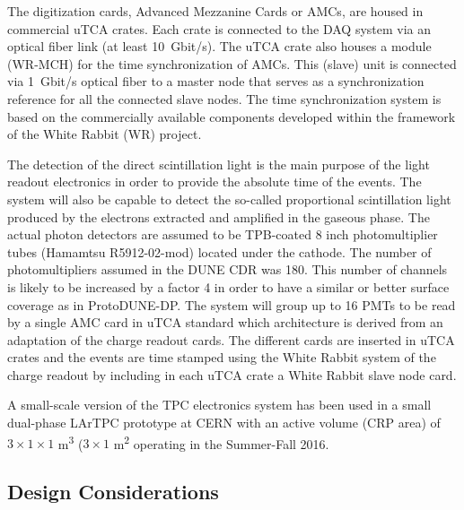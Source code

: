 The digitization cards, Advanced Mezzanine Cards or AMCs, are housed in commercial uTCA crates. Each crate is connected to the DAQ system via an optical fiber link (at least \SI{10}{Gbit/s}). The uTCA crate also houses a module (WR-MCH) for the time synchronization of AMCs. This (slave) unit is connected via \SI{1}{Gbit/s} optical fiber to a master node that serves as a synchronization reference for all the connected slave nodes.  The time synchronization system is based on the commercially available components developed within the framework of the White Rabbit (WR) project. 

The detection of the direct scintillation light is the main purpose of the light readout electronics in order to provide the absolute time of the events. The system will also be capable to detect the so-called proportional scintillation light produced by the electrons extracted and amplified in the gaseous phase. The actual photon detectors are assumed to be TPB-coated \num{8} inch photomultiplier tubes (Hamamtsu R5912-02-mod) located under the cathode. The number of photomultipliers assumed in the DUNE CDR was 180. This number of channels is likely to be increased by a factor 4 in order to have a similar or better surface coverage as in ProtoDUNE-DP. The system will group up to 16 PMTs to be read by a single AMC card in uTCA standard which architecture is derived from an adaptation of the charge readout cards. The different cards are inserted in uTCA crates and the events are time stamped using the White Rabbit system of the charge readout by including in each uTCA crate a White Rabbit slave node card.

A small-scale version of the TPC electronics system has been used in a small dual-phase LArTPC prototype at CERN with an active volume (CRP area) of $3\times 1 \times 1$ \si{\meter\cubed} ($3\times1$ \si{\meter\squared} operating in the Summer-Fall 2016. 


\subsection{Design Considerations}
\label{sec:fddp-tpc-elec-des-consid}

